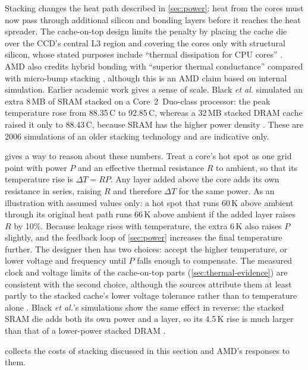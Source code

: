 Stacking changes the heat path described in \cref{sec:power}: heat from the cores must now pass through additional silicon and bonding layers before it reaches the heat spreader. The cache-on-top design limits the penalty by placing the cache die over the CCD's central L3 region \cite{amd2022epyc7003} and covering the cores only with structural silicon, whose stated purposes include ``thermal dissipation for CPU cores'' \cite[slide~12]{wuu2022vcache}. AMD also credits hybrid bonding with ``superior thermal conductance'' compared with micro-bump stacking \cite[slide~15]{wuu2022vcache}, although this is an AMD claim based on internal simulation. Earlier academic work gives a sense of scale. Black \emph{et al.} simulated an extra 8\,MB of SRAM stacked on a Core~2~Duo-class processor: the peak temperature rose from 88.35\,\textdegree C to 92.85\,\textdegree C, whereas a 32\,MB stacked DRAM cache raised it only to 88.43\,\textdegree C, because SRAM has the higher power density \cite{blackStacking3DMicroarchitecture2006}. These are 2006 simulations of an older stacking technology and are indicative only.

 gives a way to reason about these numbers. Treat a core's hot spot as one grid point with power $P$ and an effective thermal resistance $R$ to ambient, so that its temperature rise is $\Delta T = RP$. Any layer added above the core adds its own resistance in series, raising $R$ and therefore $\Delta T$ for the same power. As an illustration with assumed values only: a hot spot that runs 60\,K above ambient through its original heat path runs 66\,K above ambient if the added layer raises $R$ by 10\%. Because leakage rises with temperature, the extra 6\,K also raises $P$ slightly, and the feedback loop of \cref{sec:power} increases the final temperature further. The designer then has two choices: accept the higher temperature, or lower voltage and frequency until $P$ falls enough to compensate. The measured clock and voltage limits of the cache-on-top parts (\cref{sec:thermal-evidence}) are consistent with the second choice, although the sources attribute them at least partly to the stacked cache's lower voltage tolerance rather than to temperature alone \cite{lamAMDs7950X3DZen2023}. Black \emph{et al.}'s simulations show the same effect in reverse: the stacked SRAM die adds both its own power and a layer, so its 4.5\,K rise is much larger than that of a lower-power stacked DRAM \cite{blackStacking3DMicroarchitecture2006}.

 collects the costs of stacking discussed in this section and AMD's responses to them.

